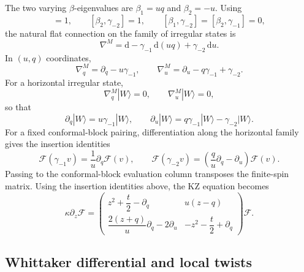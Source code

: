 \documentclass[a4paper,11pt]{article}
\newcommand{\cF}{\mathcal{F}}
\newcommand{\dd}{\mathrm{d}}
\numberwithin{equation}{section}
\begin{document}
The two varying $\beta$-eigenvalues are $\beta_1 = uq$ and $\beta_2=-u$.  Using
\begin{equation}
	[\beta_{1},\gamma_{-1}]=1,
	\qquad
	[\beta_{2},\gamma_{-2}]=1,
	\qquad
	[\beta_{1},\gamma_{-2}]=[\beta_{2},\gamma_{-1}]=0,
\end{equation}
the natural flat connection on the family of irregular states is
\begin{equation}
	\nabla^{M}
	=
	\dd-\gamma_{-1}\,\dd(uq)+\gamma_{-2}\,\dd u.
\end{equation}
In $(u,q)$ coordinates,
\begin{equation}
	\nabla_{q}^{M}=\partial_{q}-u\gamma_{-1},
	\qquad
	\nabla_{u}^{M}=\partial_{u}-q\gamma_{-1}+\gamma_{-2}.
\end{equation}
For a horizontal irregular state,
\begin{equation}
	\nabla_{q}^{M}|W\rangle=0,
	\qquad
	\nabla_{u}^{M}|W\rangle=0,
\end{equation}
so that
\begin{equation}
	\partial_{q}|W\rangle
	=
	u\gamma_{-1}|W\rangle,
	\qquad
	\partial_{u}|W\rangle
	=
	q\gamma_{-1}|W\rangle-\gamma_{-2}|W\rangle.
\end{equation}
For a fixed conformal-block pairing, differentiation along the
horizontal family gives the insertion identities
\begin{equation}
	\label{equation:physical family insertion identities}
	\cF(\gamma_{-1}v)
	=
	\frac{1}{u}\partial_{q}\cF(v),
	\qquad
	\cF(\gamma_{-2}v)
	=
	\left(
	\frac{q}{u}\partial_{q}-\partial_{u}
	\right)\cF(v).
\end{equation}
Passing to the conformal-block evaluation column transposes the finite-spin matrix. Using the insertion identities above, the KZ equation becomes
\begin{equation}
	\label{equation:physical evaluation KZ}
	\kappa\partial_{z}\cF
	=
	\begin{pmatrix}
		z^{2}+\dfrac{t}{2}-\partial_{q}
		&
		u(z-q)
		\\[3mm]
		\dfrac{2(z+q)}{u}\partial_{q}-2\partial_{u}
		&
		-z^{2}-\dfrac{t}{2}+\partial_{q}
	\end{pmatrix}
	\cF.
\end{equation}

\subsection{Whittaker differential and local twists}
\end{document}
